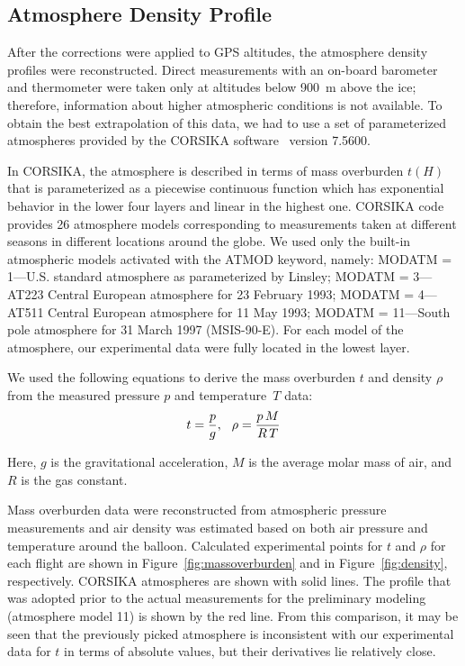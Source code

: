 \documentclass[universe,article,accept,moreauthors,pdftex]{Definitions/mdpi}
\begin{document}
\subsection{Atmosphere Density Profile}
\label{sect:atmosphere-profile}

After the corrections were applied to GPS altitudes, the atmosphere density profiles were reconstructed. Direct measurements with an on-board barometer and thermometer were taken only at altitudes below 900~m above the ice; therefore, information about higher atmospheric conditions is not available. To obtain the best extrapolation of this data, we had to use a set of parameterized atmospheres provided by the CORSIKA software~\cite{hec98} version 7.5600.

In CORSIKA, the atmosphere is described in terms of mass overburden $t(H)$ that is parameterized as a piecewise continuous function which has exponential behavior in the lower four layers and linear in the highest one. CORSIKA code provides 26 atmosphere models corresponding to measurements taken at different seasons in different locations around the globe. 
{{We used only the built-in atmospheric models activated with the ATMOD keyword, namely: MODATM = 1---U.S. standard atmosphere as parameterized by Linsley; MODATM = 3---AT223 Central European atmosphere for 23 February 1993; MODATM = 4---AT511 Central European atmosphere for 11 May 1993; MODATM = 11---South pole atmosphere for 31 March 1997 (MSIS-90-E).}}
For each model of the atmosphere, our experimental data were fully located in the lowest layer.

We used the following equations to derive the mass overburden $t$ and density $\rho$ from the measured pressure $p$ and temperature~$T$ data:
\begin{equation}
t     = \frac{p}{g}, \\ \hspace{7pt}
\rho  = \frac{p \, M}{R \, T} \\
\end{equation}

Here, $g$ is the gravitational acceleration, $M$ is the average molar mass of air, and $R$ is the gas constant.

Mass overburden data were reconstructed from atmospheric pressure measurements and air density was estimated based on both air pressure and temperature around the balloon. Calculated experimental points for $t$ and $\rho$ for each flight are shown in Figure~\ref{fig:massoverburden} and in Figure~\ref{fig:density}, respectively. CORSIKA atmospheres are shown with solid lines. The profile that was adopted prior to the actual measurements for the preliminary modeling (atmosphere model 11) is shown by the red line. From this comparison, it may be seen that the previously picked atmosphere is inconsistent with our experimental data for $t$ in terms of absolute values, but their derivatives lie relatively close. 
\end{document}

